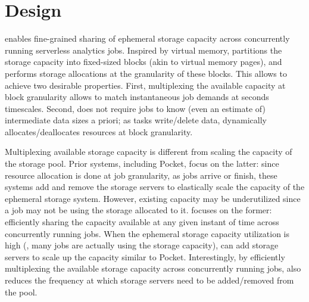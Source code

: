 \section{\jiffy Design}
\label{sec:design}

\jiffy enables fine-grained sharing of ephemeral storage capacity across concurrently running serverless analytics jobs. Inspired by virtual memory, \jiffy partitions the storage capacity into fixed-sized blocks (akin to virtual memory pages), and performs storage allocations at the granularity of these blocks. This allows \jiffy to achieve two desirable properties. First, multiplexing the available capacity at block granularity allows \jiffy to match instantaneous job demands at seconds timescales. Second, \jiffy does not require jobs to know (even an estimate of) intermediate data sizes a priori; as tasks write/delete data, \jiffy dynamically allocates/deallocates resources at block granularity. %

 Multiplexing available storage capacity is different from scaling the capacity of the storage pool. Prior systems, including Pocket, focus on the latter: since resource allocation is done at job granularity, as jobs arrive or finish, these systems add and remove the storage servers to elastically scale the capacity of the ephemeral storage system. However, existing capacity may be underutilized since a job may not be using the storage allocated to it. \jiffy focuses on the former: efficiently sharing the capacity available at any given instant of time across concurrently running jobs. When the ephemeral storage capacity utilization is high (\ie, many jobs are actually using the storage capacity), \jiffy can add storage servers to scale up the capacity similar to Pocket. Interestingly, by efficiently multiplexing the available storage capacity across concurrently running jobs, \jiffy also reduces the frequency at which storage servers need to be added/removed from the pool.

